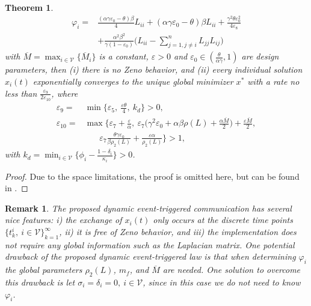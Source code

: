 \documentclass[letterpaper, 10 pt, conference]{ieeeconf}  %
\newtheorem{theorem}{Theorem}
\newtheorem{remark}{Remark}
\begin{document}
\begin{theorem}
\begin{align}
\varphi_i=&\frac{(\alpha\gamma\varepsilon_0-\theta)\beta}{4}L_{ii}+(\alpha\gamma\varepsilon_0-\theta)\beta L_{ii}+\frac{\gamma^2\theta
\varepsilon_0^2 }{4\varepsilon_8}\nonumber\\
&+\frac{\alpha^2\beta^2}{\gamma(1-\varepsilon_0)}\Big(L_{ii}-\sum_{j=1,j\neq i}^nL_{jj}L_{ij}\Big)
\end{align}
with $\overline{M}=\max_{i\in\mathcal{V}}\{\overline{M}_i\}$ is a constant, $\varepsilon>0$ and $\varepsilon_0\in(\frac{\theta}{\alpha\gamma},1)$ are design parameters,
then (i) there is no Zeno behavior, and (ii) every individual solution $x_i(t)$ exponentially converges to the unique global minimizer $x^*$ with a rate no less than $\frac{\varepsilon_9}{2\varepsilon_{10}}$, where
\begin{align}
\varepsilon_9=&\min\Big\{\varepsilon_5,
~\frac{\varepsilon\theta }{4},~k_d\Big\}>0,\label{cdc18so:varepsilon9}\\
\varepsilon_{10}=&\max\Big\{\varepsilon_7
+\frac{\varepsilon}{\alpha},~\varepsilon_7\Big(\gamma^2\varepsilon_0+
\alpha\beta\rho(L)+\frac{\alpha \overline{M}}{2}\Big)+\frac{\varepsilon \overline{M}}{2},\nonumber\\
&~~~~~~~~\varepsilon_7
\frac{\theta\gamma\varepsilon_0}{\beta\rho_2(L)}+\frac{\varepsilon\alpha}{\rho_2(L)}\Big\}>1,
\label{cdc18so:varepsilon10}
\end{align}
with  $k_d=\min_{i\in\mathcal{V}}\Big \{ \phi_i-\frac{1-\delta_i}{\kappa_i}\Big\}>0$.
\end{theorem}


\begin{proof}
Due to the space limitations, the proof is omitted here, but can be found in \cite{yi2018distributedopti}.
\end{proof}

\begin{remark}
The proposed dynamic event-triggered communication has several nice features: i) the exchange of $x_i(t)$ only occurs at the discrete time points $\{t^i_k,~i\in\mathcal V\}_{k=1}^{\infty}$, ii) it is free of Zeno behavior, and iii) the implementation does not require any global information such as the Laplacian matrix.
One potential drawback of the proposed dynamic event-triggered law is that when determining  $\varphi_i$ the global parameters $\rho_2(L)$, $m_f$, and $\overline{M}$ are needed.
One solution to overcome this drawback is let $\sigma_i=\delta_i=0,~i\in\mathcal V$, since in this case we do not need to know $\varphi_i$. %
\end{remark}
\end{document}
